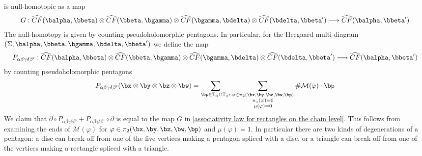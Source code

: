 is null-homotopic as a map
\[ G : \widehat{CF}(\balpha,\bbeta) \otimes \widehat{CF}(\bbeta,\bgamma) \otimes \widehat{CF}(\bgamma,\bdelta) \otimes \widehat{CF}(\bdelta,\bbeta') \longrightarrow \widehat{CF}(\balpha,\bbeta') \]
The null-homotopy is given by counting pseudoholomorphic pentagons. In particular, for the Heegaard multi-diagram $(\Sigma,\balpha,\bbeta,\bgamma,\bdelta,\bbeta')$ we define the map
\[ P_{\alpha\beta\gamma\delta\beta'} : \widehat{CF}(\balpha,\bbeta) \otimes \widehat{CF}(\bbeta,\bgamma) \otimes \widehat{CF}(\bgamma,\bdelta) \otimes \widehat{CF}(\bdelta,\bbeta') \longrightarrow \widehat{CF}(\balpha,\bbeta') \]
by counting pseudoholomorphic pentagons
\[ P_{\alpha\beta\gamma\delta\beta'}(\bx \otimes \by \otimes \bz \otimes \bw) = \sum_{\bp \in \mathbb T_\alpha \cap \mathbb T_{\beta'}} \sum_{\substack{\varphi \in \pi_2(\bx,\by,\bz,\bw,\bp) \\ n_z(\varphi)=0 \\ \mu(\varphi)=0}} \# \mathcal M(\varphi) \cdot \bp \]
We claim that $\partial \circ P_{\alpha\beta\gamma\delta\beta'} + P_{\alpha\beta\gamma\delta\beta'} \circ \partial$ is equal to the map $G$ in \eqref{associativity law for rectangles on the chain level}. This follows from examining the ends of $\mathcal M(\varphi)$ for $\varphi \in \pi_2(\bx,\by,\bz,\bw,\bp)$ and $\mu(\varphi)=1$. In particular there are two kinds of degenerations of a pentagon: a disc can break off from one of the five vertices making a pentagon spliced with a disc, or a triangle can break off from one of the vertices making a rectangle spliced with a triangle.

